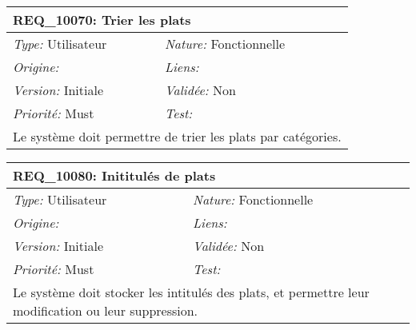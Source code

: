 \begin{table}[!ht]

\begin{tabular}{|p{60mm}p{100mm}|}

\hline

\multicolumn{2}{|l|}{\textbf{REQ\_10070:} Trier les plats} \\ \hline

\emph{Type:} Utilisateur & \emph{Nature:} Fonctionnelle \\

\emph{Origine:}  & \emph{Liens:}  \\

\emph{Version:} Initiale & \emph{Validée:} Non \\

\emph{Priorité:} Must & \emph{Test:} \\ \hline

\multicolumn{2}{|p{16cm}|}{Le système doit permettre de trier les plats par catégories.} \\ \hline

\end{tabular}

\end{table}



\begin{table}[!ht]

\begin{tabular}{|p{60mm}p{100mm}|}

\hline

\multicolumn{2}{|l|}{\textbf{REQ\_10080:} Inititulés de plats} \\ \hline

\emph{Type:} Utilisateur & \emph{Nature:} Fonctionnelle \\

\emph{Origine:}  & \emph{Liens:}  \\

\emph{Version:} Initiale & \emph{Validée:} Non \\

\emph{Priorité:} Must & \emph{Test:} \\ \hline

\multicolumn{2}{|p{16cm}|}{Le système doit stocker les intitulés des plats, et permettre leur modification ou leur suppression.} \\ \hline

\end{tabular}

\end{table}



